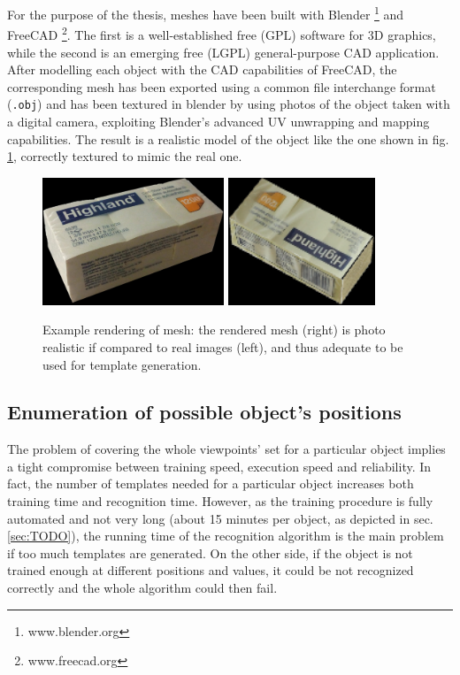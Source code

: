 For the purpose of the thesis, meshes have been built with Blender
\footnote{www.blender.org} and FreeCAD \footnote{www.freecad.org}. The first is a
well-established free (GPL) software for 3D graphics, while the second is an
emerging free (LGPL) general-purpose CAD application. After modelling each
object with the CAD capabilities of FreeCAD, the corresponding mesh has been
exported using a common file interchange format (\texttt{.obj}) and has been
textured in blender by using photos of the object taken with a digital camera,
exploiting Blender's advanced UV unwrapping and mapping capabilities. The result
is a realistic model of the object like the one shown in fig.
\ref{fig:realistic_rendering}, correctly textured to mimic the real one.

\begin{figure}[htbp]
\centering
\includegraphics[height=1.5in]{./Results/postit_photo}
\includegraphics[height=1.5in]{./Results/postit_render}
\caption{Example rendering of mesh: the rendered mesh (right) is photo realistic
  if compared to real images (left),
and thus adequate to be used for template generation. \label{fig:realistic_rendering}}
\end{figure}

\subsection{Enumeration of possible object's positions}
The problem of covering the whole viewpoints' set for a particular object
implies a tight compromise between training speed, execution speed and
reliability. In fact, the number of templates needed for a particular object increases
both training time and recognition time. However, as the training procedure is
fully automated and not very long (about 15 minutes per object, as depicted in sec.
\ref{sec:TODO}), %
the running time of the recognition algorithm is the main problem if too much
templates are generated. On the other side, if the object is not trained enough
at different positions and values, it could be not recognized correctly and the
whole algorithm could then fail.

